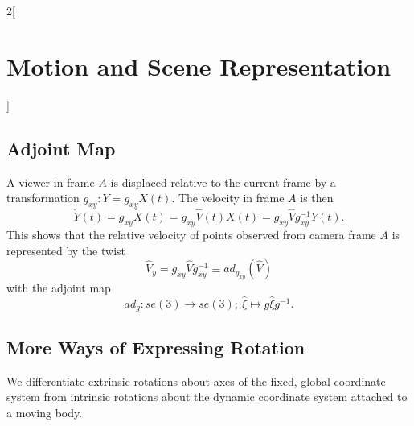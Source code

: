 \documentclass[oneside,fontsize=11pt,paper=a4]{scrartcl}
\begin{document}
\begin{multicols}{2}[\section{Motion and Scene Representation}]
\subsection{Adjoint Map}
A viewer in frame $A$ is displaced relative to the current frame by a transformation $g_{xy}: Y = g_{xy} X(t)$.
The velocity in frame $A$ is then
\begin{equation*}
    \dot{Y}(t) = g_{xy} \dot{X}(t) = g_{xy} \hat{V}(t) X(t) = g_{xy} \hat{V} g_{xy}^{-1} Y(t).
\end{equation*}
This shows that the relative velocity of points observed from camera frame $A$ is represented by the twist
\begin{equation*}
    \hat{V}_y = g_{xy} \hat{V} g_{xy}^{-1} \equiv ad_{g_{xy}}(\hat{V})
\end{equation*}
with the adjoint map
\begin{equation*}
	ad_g: se(3) \rightarrow se(3); \ \hat{\xi} \mapsto g \hat{\xi} g^{-1}.
\end{equation*}

\subsection{More Ways of Expressing Rotation}

We differentiate extrinsic rotations about axes of the fixed, global coordinate system from intrinsic rotations about the dynamic coordinate system attached to a moving body. 


\end{multicols}
\end{document}
